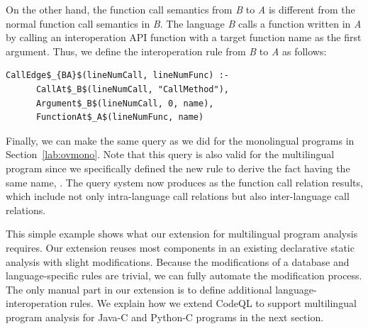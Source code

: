 \noindent
On the other hand, the function call semantics from {\it B} to {\it A} is
different from the normal function call semantics in {\it B}. The language {\it
B} calls a function written in {\it A} by calling an interoperation API
function  with a target function name as the first argument.
Thus, we define the interoperation rule from {\it B} to {\it A} as follows:

\begin{lstlisting}[style=mrule]
    CallEdge$_{BA}$(lineNumCall, lineNumFunc) :-
      CallAt$_B$(lineNumCall, "CallMethod"),
      Argument$_B$(lineNumCall, 0, name),
      FunctionAt$_A$(lineNumFunc, name)
\end{lstlisting}

Finally, we can make the same query  as we did for the
monolingual programs in Section~\ref{lab:ovmono}. Note that this query is also valid
for the multilingual program since we specifically defined the new rule to derive the fact having
the same name, . The query system now produces
  as the function call
relation results, which include not only intra-language call relations but also
inter-language call relations.

This simple example shows what our extension for multilingual program analysis
requires. Our extension reuses most components in an existing declarative
static analysis with slight modifications. Because the modifications of a
database and language-specific rules are trivial, we can fully automate the
modification process.  The only manual part in our extension is to define
additional language-interoperation rules. We explain how we extend CodeQL to
support multilingual program analysis for Java-C and Python-C programs in the
next section.
